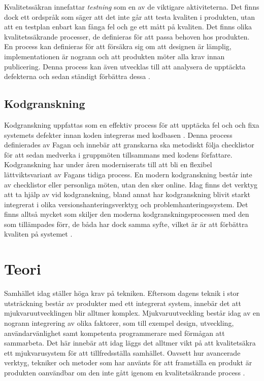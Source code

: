 Kvalitetssäkran innefattar \textit{testning} som en av de viktigare aktiviteterna. Det finns dock ett ordspråk som säger att det inte går att testa kvaliten i produkten, utan att en testplan enbart kan fånga fel och ge ett mått på kvaliten. Det finns olika kvalitetssäkrande processer, de definieras för att passa behoven hos produkten. En process kan definieras för att försäkra sig om att designen är lämplig, implementationen är nogrann och att produkten möter alla krav innan publicering. Denna process kan även utvecklas till att analysera de upptäckta defekterna och sedan ständigt förbättra dessa \cite{feldman2005quality}.


\subsection{Kodgranskning}
Kodgranskning uppfattas som en effektiv process för att upptäcka fel och och fixa systemets defekter innan koden integreras med kodbasen \cite{mcintosh2014impact}. Denna process definierades av Fagan \cite{fagan1999design} och innebär att granskarna ska metodiskt följa checklistor för att sedan medverka i gruppmöten tillsammans med kodens författare. Kodgranskning har under åren moderniserats till att bli en flexibel lättviktsvariant av Fagans tidiga process. En modern kodgranskning består inte av checklistor eller personliga möten, utan den sker online. Idag finns det verktyg att ta hjälp av vid kodgranskning, bland annat har kodgranskning blivit starkt integrerat i olika versionshanteringsverktyg och problemhanteringssystem. Det finns alltså mycket som skiljer den moderna kodgranskningsprocessen med den som tillämpades förr, de båda har dock samma syfte, vilket är är att förbättra kvaliten på systemet \cite{shimagaki2016study}.

\clearpage

\section{Teori}
\label{sec:theory-wallstrom}

Samhället idag ställer höga krav på tekniken. Eftersom dagens teknik i stor utsträckning består av produkter med ett integrerat system, innebär det att mjukvaruutvecklingen blir alltmer komplex. Mjukvaruutveckling består idag av en nogrann integrering av olika faktorer, som till exempel design, utveckling, användarvänlighet samt kompetenta programmerare med förmågan att sammarbeta. Det här innebär att idag läggs det alltmer vikt på att kvalitetsäkra ett mjukvarusystem för att tillfredsställa samhället. Oavsett hur avancerade verktyg, tekniker och metoder som har använts för att framställa en produkt är produkten oanvändbar om den inte gått igenom en kvalitetsäkrande process \cite{gill2005factors}.





